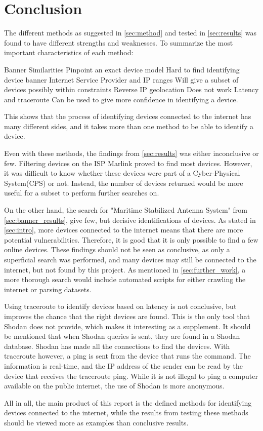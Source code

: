 \section{Conclusion} \label{sec:conclusion}

The different methods as suggested in \cref{sec:method} and tested in \cref{sec:results} was found to have different strengths and weaknesses. To summarize the most important characteristics of each method:

\begin{outline}[itemize]
    \setlength\itemsep{10em}
        \1 Banner Similarities
        \2 Pinpoint an exact device model
        \2 Hard to find identifying device banner
        \1 Internet Service Provider and IP ranges
        \2 Will give a subset of devices possibly within constraints
        \1 Reverse IP geolocation
        \2 Does not work
        \1 Latency and traceroute
        \2 Can be used to give more confidence in identifying a device.

\end{outline}

This shows that the process of identifying devices connected to the internet has many different sides, and it takes more than one method to be able to identify a device.

Even with these methods, the findings from \cref{sec:results} was either inconclusive or few. Filtering devices on the ISP Marlink proved to find most devices. However, it was difficult to know whether these devices were part of a Cyber-Physical System(CPS) or not. Instead, the number of devices returned would be more useful for a subset to perform further searches on. 

On the other hand, the search for "Maritime Stabilized Antenna System" from \cref{sec:banner_results}, give few, but decisive identifications of devices. As stated in \cref{sec:intro}, more devices connected to the internet means that there are more potential vulnerabilities. Therefore, it is good that it is only possible to find a few online devices. These findings should not be seen as conclusive, as only a superficial search was performed, and many devices may still be connected to the internet, but not found by this project. As mentioned in \cref{sec:further_work}, a more thorough search would include automated scripts for either crawling the internet or parsing datasets. 


Using traceroute to identify devices based on latency is not conclusive, but improves the chance that the right devices are found. This is the only tool that Shodan does not provide, which makes it interesting as a supplement. It should be mentioned that when Shodan queries is sent, they are found in a Shodan database. Shodan has made all the connections to find the devices. With traceroute however, a ping is sent from the device that runs the command. The information is real-time, and the IP address of the sender can be read by the device that receives the traceroute ping. While it is not illegal to ping a computer available on the public internet, the use of Shodan is more anonymous. 


All in all, the main product of this report is the defined methods for identifying devices connected to the internet, while the results from testing these methods should be viewed more as examples than conclusive results. 
